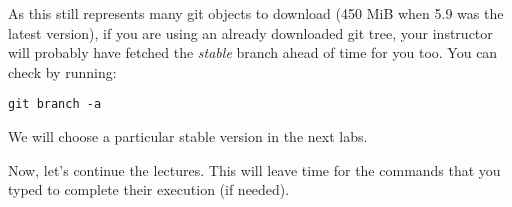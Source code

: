 As this still represents many git objects to download (450 MiB when 5.9 was
the latest version), if you are using an already downloaded git tree,
your instructor will probably have fetched the {\em stable} branch ahead
of time for you too. You can check by running:

\begin{verbatim}
git branch -a
\end{verbatim}

We will choose a particular stable version in the next labs.

Now, let's continue the lectures. This will leave time for the commands
that you typed to complete their execution (if needed).
